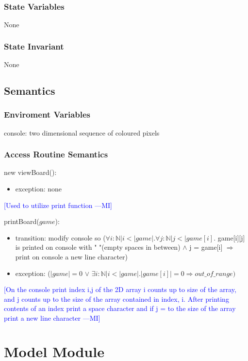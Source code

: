 \documentclass{article}
\newcommand{\authornote}[3]{\textcolor{#1}{[#3 ---#2]}}
\newcommand{\authornote}[3]{}
\newcommand{\wss}[1]{\authornote{blue}{MI}{#1}}
\begin{document}
\subsubsection* {State Variables}

None

\subsubsection* {State Invariant}

None
\subsection*{Semantics}
\subsubsection*{Enviroment Variables}
console: two dimensional sequence of coloured pixels
\subsubsection* {Access Routine Semantics}
new viewBoard():
\begin{itemize}
\item exception: none
\end{itemize}
\wss{Used to utilize print function}

\newpage
\noindent printBoard($game$):
\begin{itemize}
\item transition: modify console so
($\forall i:\mathbb{N}|i<|game|. \forall j:\mathbb{N}| j<|game[i]$.
game[i][j] is printed on console with " "(empty spaces in between)
$\land$ j = game[i] $\Rightarrow$ print on console a new line character)

\item exception: ($|game| = 0 $ $\lor$  $\exists i :\mathbb{N} | i < |game|. |game[i]| = 0 \Rightarrow out\_of\_range)$
\end{itemize}
\wss{On the console print index i,j of the 2D array i counts up to size of the array, and j counts up to the size of the array contained in index, i. After printing contents of an index print a space character and if j = to the size of the array print a new line character}

\newpage

\section*{Model Module}
\end{document}
